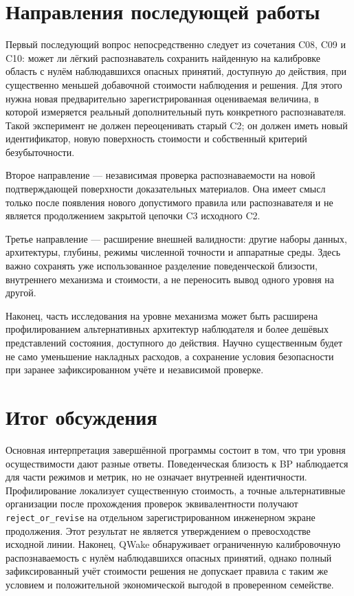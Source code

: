 \section{Направления последующей работы}
\label{sec:discussion-future}

Первый последующий вопрос непосредственно следует из сочетания C08, C09 и C10:
может ли лёгкий распознаватель сохранить найденную на калибровке область с
нулём наблюдавшихся опасных принятий, доступную до действия, при существенно
меньшей добавочной стоимости наблюдения и решения. Для этого нужна новая предварительно зарегистрированная оцениваемая
величина, в которой измеряется реальный дополнительный путь конкретного
распознавателя. Такой эксперимент не должен переоценивать старый C2; он должен
иметь новый идентификатор, новую поверхность стоимости и собственный критерий
безубыточности.

Второе направление --- независимая проверка распознаваемости на новой
подтверждающей поверхности доказательных материалов. Она имеет смысл только
после появления нового допустимого правила или распознавателя и не является
продолжением закрытой цепочки C3 исходного C2.

Третье направление --- расширение внешней валидности: другие наборы данных,
архитектуры, глубины, режимы численной точности и аппаратные среды. Здесь важно
сохранять уже использованное разделение поведенческой близости, внутреннего
механизма и стоимости, а не переносить вывод одного уровня на другой.

Наконец, часть исследования на уровне механизма может быть расширена
профилированием альтернативных архитектур наблюдателя и более дешёвых
представлений состояния, доступного до действия. Научно существенным будет не
само уменьшение накладных расходов, а сохранение условия безопасности при
заранее зафиксированном учёте и независимой проверке.

\section{Итог обсуждения}

Основная интерпретация завершённой программы состоит в том, что три уровня
осуществимости дают разные ответы. Поведенческая близость к BP наблюдается для
части режимов и метрик, но не означает внутренней идентичности. Профилирование
локализует существенную стоимость, а точные альтернативные организации после
прохождения проверок эквивалентности получают \texttt{reject\_or\_revise} на
отдельном зарегистрированном инженерном экране продолжения. Этот результат не
является утверждением о превосходстве исходной линии. Наконец, QWake обнаруживает ограниченную
калибровочную распознаваемость с нулём наблюдавшихся опасных принятий, однако
полный зафиксированный учёт стоимости решения не допускает правила с таким же
условием и положительной экономической выгодой в проверенном семействе.


